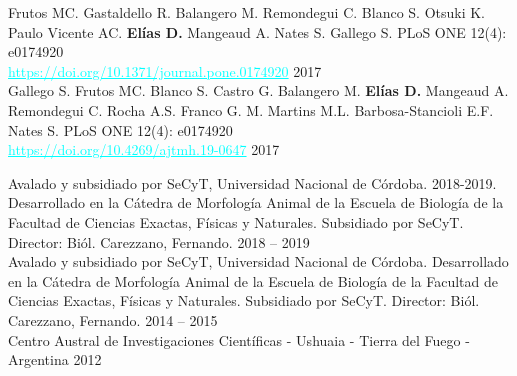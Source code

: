 \documentclass[
	a4paper,
]{fortysecondscv}
\begin{document}
\begin{cvtable}
	{Frutos MC. Gastaldello R. Balangero M. Remondegui C. Blanco S. Otsuki K. Paulo Vicente AC. \textbf{Elías D.} Mangeaud A. Nates S. Gallego S.}
	{PLoS ONE 12(4): e0174920\\
		\textcolor{cyan}{\underline{https://doi.org/10.1371/journal.pone.0174920}}}
	{2017}
	\\
	

	
	{Gallego S. Frutos MC. Blanco S. Castro G. Balangero M. \textbf{Elías D.} Mangeaud A. Remondegui C. Rocha A.S. Franco G. M. Martins M.L. Barbosa-Stancioli E.F. Nates S.}
	{PLoS ONE 12(4): e0174920\\
		\textcolor{cyan}{\underline{https://doi.org/10.4269/ajtmh.19-0647}}}
	{2017}
	
	

\end{cvtable}




\begin{cvtable}
	{Avalado y subsidiado por SeCyT, Universidad Nacional de Córdoba. 2018-2019. Desarrollado en la Cátedra de Morfología Animal de la Escuela de Biología de la Facultad de Ciencias Exactas, Físicas y Naturales. Subsidiado por SeCyT. Director: Biól. Carezzano, Fernando.}
	{}
	{2018 -- 2019}
	\\
	
	{Avalado y subsidiado por SeCyT, Universidad Nacional de Córdoba. Desarrollado en la Cátedra de Morfología Animal de la Escuela de Biología de la Facultad de Ciencias Exactas, Físicas y Naturales. Subsidiado por SeCyT. Director: Biól. Carezzano, Fernando.}
	{}
	{2014 -- 2015}
		\\
	
	{Centro Austral de Investigaciones Científicas - Ushuaia - Tierra del Fuego - Argentina}
	{}
	{2012}
	
	

\end{cvtable}
\end{document}
